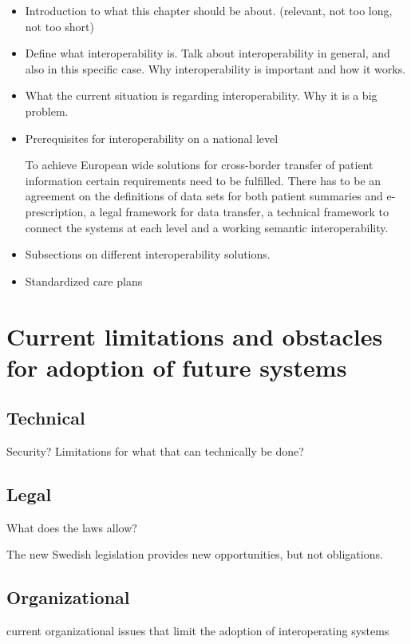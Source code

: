 \documentclass[12pt]{article}
\begin{document}
\begin{itemize}
\item Introduction to what this chapter should be about. (relevant, not too long, not too short)
\item Define what interoperability is. Talk about interoperability in general, and also in this specific case. Why interoperability is important and how it works.
\item What the current situation is regarding interoperability. Why it is a big problem.
\item Prerequisites for interoperability on a national level

To achieve European wide solutions for cross-border transfer of patient information certain requirements need to be fulfilled. There has to be an agreement on the definitions of data sets for both patient summaries and e-prescription, a legal framework for data transfer, a technical framework to connect the systems at each level and a working semantic interoperability. \cite{epSOS1}

\item Subsections on different interoperability solutions.
\item Standardized care plans
\end{itemize}


\section{Current limitations and obstacles for adoption of future systems}

\subsection{Technical}
Security? Limitations for what that can technically be done?

\subsection{Legal}
What does the laws allow? 

The new Swedish legislation provides new opportunities, but not obligations. \cite{RiR19}

\subsection{Organizational}
current organizational issues that limit the adoption of interoperating systems
\end{document}
